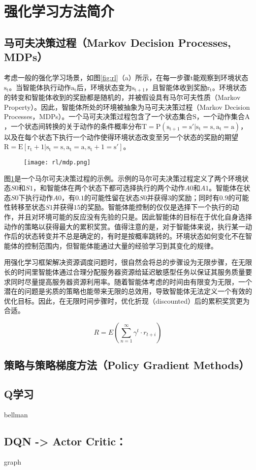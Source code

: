 \section{强化学习方法简介}
\subsection{马可夫决策过程（Markov Decision Processes, MDPs）}
考虑一般的强化学习场景，如图\ref{fig:rl}（a）所示，在每一步骤$\mathrm{t}$能观察到环境状态$\mathrm{s_t}$。当智能体执行动作$\mathrm{a_t}$后，环境状态变为$\mathrm{s_{t+1}}$，且智能体收到奖励$\mathrm{r_t}$。环境状态的转变和智能体收到的奖励都是随机的，并被假设具有马尔可夫性质（Markov Property）。因此，智能体所处的环境被抽象为马可夫决策过程（Markov Decision Processes，MDPs）。一个马可夫决策过程包含了一个状态集合$\mathrm{S}$，一个动作集合$\mathrm{A}$，一个状态间转换的关于动作的条件概率分布$\mathrm{T=P(s_{t+1}=s'|s_t=s, a_t = a)}$，以及在每个状态下执行一个动作使得环境状态改变至另一个状态的奖励的期望$\mathrm{R=E[r_t+1|s_t=s, a_t=a, s_t+1=s']}$。

\begin{figure}
  \centering
  \begin{minipage}[b]{0.7\textwidth}
    \centering
    \texttt{[image: rl/mdp.png]}
    \label{fig:mdp}
  \end{minipage}     
\end{figure}

图\ref{fig:mdp}是一个马尔可夫决策过程的示例。示例的马尔可夫决策过程定义了两个环境状态$S0$和$S1$，和智能体在两个状态下都可选择执行的两个动作$A0$和$A1$。智能体在状态$S0$下执行动作$A0$，有$0.1$的可能性留在状态$S0$并获得$3$的奖励；同时有$0.9$的可能性转移至状态$S1$并获得$15$的奖励。智能体能控制的仅仅是选择下一个执行的动作，并且对环境可能的反应没有先验的只是。因此智能体的目标在于优化自身选择动作的策略以获得最大的累积奖赏。值得注意的是，对于智能体来说，执行某一动作后的状态转变并不总是确定的，有时是按概率跳转的。环境状态如何变化不在智能体的控制范围内，但智能体能通过大量的经验学习到其变化的规律。

用强化学习框架解决资源调度问题时，很自然会将总的步骤设为无限步骤，在无限长的时间里智能体通过合理分配服务器资源给延迟敏感型任务以保证其服务质量要求同时尽量提高服务器资源利用率。随着智能体考虑的时间由有限变为无限，一个潜在的问题是劣质的策略也能带来无限的总效用，导致智能体无法定义一个有效的优化目标。因此，在无限时间步骤时，优化折现（discounted）后的累积奖赏更为合适。

  \begin{equation}
    \label{eq:discounted_reward}
    R = E(\sum_{n=1}^{\infty} {\gamma^{t}} \cdot r_{t+i})
  \end{equation}

\subsection{策略与策略梯度方法（Policy Gradient Methods）}


\subsection{Q学习}
bellman

\subsection{DQN -> Actor Critic：}
graph